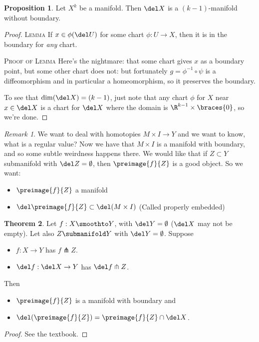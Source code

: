 \documentclass[a5paper]{article}
\theoremstyle{definition}%
\newtheorem{theorem}{Theorem}
\newtheorem{proposition}[theorem]{Proposition}
\numberwithin{exercise}{section}
\theoremstyle{remark}%
\newtheorem*{remark*}{Remark}
\begin{document}
\begin{highlight}
\begin{proposition}
Let $X^k$ be a manifold. Then $\del X$ is a $(k-1)$-manifold without boundary. 
\end{proposition}
\end{highlight}
\begin{proof}\mbox{}

\textsc{Lemma} If $x\in \phi(\del U)$ for some chart $\phi:U\to X$, then it is in the boundary for \textit{any} chart. 

\textsc{Proof of Lemma}
Here's the nightmare: that some chart gives $x$ as a boundary point, but some other chart does not:
but fortunately $g=\phi^{-1}\circ \psi$ is a diffeomorphism and in particular a homeomorphism, so it preserves the boundary. %
\qedwhite

To see that $\dim (\del X)= (k-1)$, just note that any chart $\phi$ for $X$ near $x\in\del X$ is a chart for $\del X$ where the domain is $\R^{k-1} \times \braces{0}$, so we're done. 
\end{proof}

\begin{remark*}
We want to deal with homotopies $M\times I \to Y$ and we want to know, what is a regular value? Now we have that $M\times I$ is a manifold with boundary, and so some subtle weirdness happens there. We would like that if $Z\subset Y$ submanifold with $\del Z = \emptyset$, then $\preimage{f}{Z}$ is a good object. So we want:
\begin{itemize}
\item $\preimage{f}{Z}$ a manifold
\item $\del \preimage{f}{Z} \subset \del (M\times I)$ (Called properly embedded)
\end{itemize}
\end{remark*}

\begin{highlight}
\begin{theorem}
\vspace*{-12pt}
Let $f:X\smoothto Y$, with $\del Y = \emptyset$ ($\del X$ may not be empty). Let also $Z\submanifold Y$ with $\del Y = \emptyset$. Suppose 
	\begin{itemize}
	\item $f:X\to Y$ has $f\pitchfork Z$. 
	\item $\del f:\del X\to Y$ has $\del f\pitchfork Z$. 
	\end{itemize}
Then 
	\begin{itemize}
	\item $\preimage{f}{Z}$ is a manifold with boundary and 
	\item $\del (\preimage{f}{Z}) = \preimage{f}{Z}\cap \del X$.
	\end{itemize}
\end{theorem}
\end{highlight}
\begin{proof}
See the textbook.
\end{proof}

\end{document}
